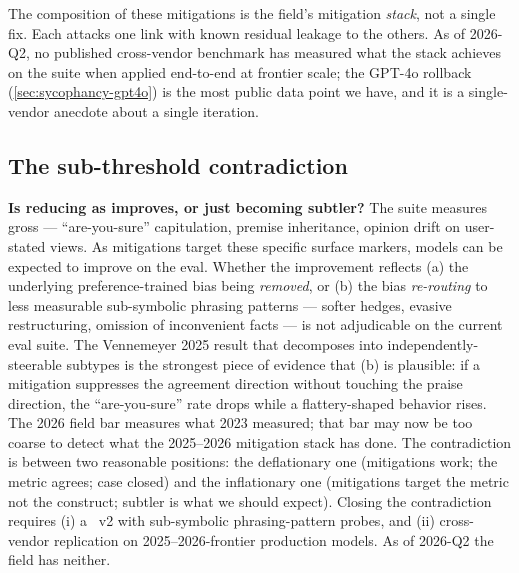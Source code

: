 The composition of these mitigations is the field's mitigation
\emph{stack}, not a single fix. Each attacks one link with known
residual leakage to the others. As of 2026-Q2, no published
cross-vendor benchmark has measured what the stack achieves on the
 suite when applied end-to-end at frontier scale; the
GPT-4o rollback (\cref{sec:sycophancy-gpt4o}) is the most public
data point we have, and it is a single-vendor anecdote about a
single iteration.

\subsection{The sub-threshold contradiction}
\label{sec:sycophancy-contradiction}

\begin{contradiction}
\textbf{Is  reducing as  improves, or just becoming
subtler?} The  suite measures gross  ---
``are-you-sure'' capitulation, premise inheritance, opinion drift on
user-stated views. As mitigations target these specific surface
markers, models can be expected to improve on the eval. Whether the
improvement reflects (a) the underlying preference-trained bias being
\emph{removed}, or (b) the bias \emph{re-routing} to less measurable
sub-symbolic phrasing patterns --- softer hedges, evasive
restructuring, omission of inconvenient facts --- is not adjudicable
on the current eval suite. The Vennemeyer 2025 result that 
decomposes into independently-steerable subtypes is the strongest
piece of evidence that (b) is plausible: if a mitigation suppresses
the agreement direction without touching the praise direction, the
 ``are-you-sure'' rate drops while a flattery-shaped
behavior rises. The 2026 field bar measures what 2023 measured; that
bar may now be too coarse to detect what the 2025--2026 mitigation
stack has done. The contradiction is between two reasonable
positions: the deflationary one (mitigations work; the metric agrees;
case closed) and the inflationary one (mitigations target the metric
not the construct; subtler  is what we should expect).
Closing the contradiction requires (i) a ~v2 with
sub-symbolic phrasing-pattern probes, and (ii) cross-vendor
replication on 2025--2026-frontier production models. As of 2026-Q2
the field has neither.
\end{contradiction}

